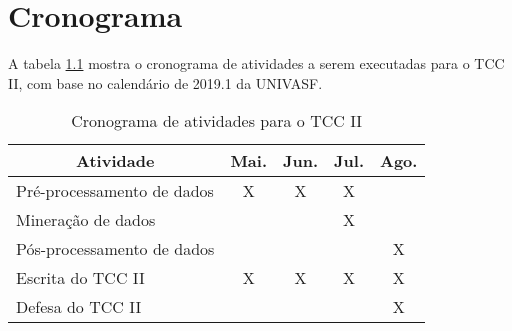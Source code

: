 \chapter{Cronograma}

A tabela \ref{tab:cronograma} mostra o cronograma de atividades a serem executadas para o TCC II, com base no calendário de 2019.1 da UNIVASF.

\begin{table}[!htb]
   \centering
   \caption{Cronograma de atividades para o TCC II}
   \label{tab:cronograma}
   \begin{tabular}{@{}lcccc@{}}
      \toprule
      \multicolumn{1}{c}{\textbf{Atividade}} & \textbf{Mai.} & \multicolumn{1}{l}{\textbf{Jun.}} & \textbf{Jul.} & \multicolumn{1}{l}{\textbf{Ago.}} \\ \midrule
      \multicolumn{1}{l|}{Pré-processamento de dados} & \multicolumn{1}{c|}{X} & \multicolumn{1}{c|}{X} & \multicolumn{1}{c|}{X} &  \\ \midrule
      \multicolumn{1}{l|}{Mineração de dados} & \multicolumn{1}{c|}{} & \multicolumn{1}{c|}{} & \multicolumn{1}{c|}{X} &  \\ \midrule
      \multicolumn{1}{l|}{Pós-processamento de dados} & \multicolumn{1}{c|}{} & \multicolumn{1}{c|}{} & \multicolumn{1}{c|}{} & X \\ \midrule
      \multicolumn{1}{l|}{Escrita do TCC II} & \multicolumn{1}{c|}{X} & \multicolumn{1}{c|}{X} & \multicolumn{1}{c|}{X} & X \\ \midrule
      \multicolumn{1}{l|}{Defesa do TCC II} & \multicolumn{1}{c|}{} & \multicolumn{1}{c|}{} & \multicolumn{1}{c|}{} & X \\ \bottomrule
   \end{tabular}
   \Ididthis
\end{table}